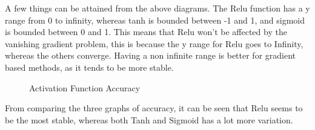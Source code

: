 A few things can be attained from the above diagrams.
The Relu function has a y range from 0 to infinity, whereas tanh is bounded between -1 and 1, and sigmoid is bounded between 0 and 1.
This means that Relu won't be affected by the vanishing gradient problem, this is because the y range for Relu goes to Infinity, whereas the others converge. Having a non infinite range is better for gradient based methods, as it tends to be more stable.

\begin{figure}[H]%
    \centering
    \qquad
    \qquad
    \caption{Activation Function Accuracy}%
\end{figure}

From comparing the three graphs of accuracy, it can be seen that Relu seems to be the most stable, whereas both Tanh and Sigmoid has a lot more variation.

